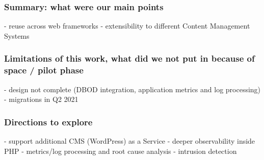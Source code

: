 \subsubsection*{Summary: what were our main points}

- reuse across web frameworks
- extensibility to different Content Management Systems

\subsubsection*{Limitations of this work, what did we not put in because of space / pilot phase}

- design not complete (DBOD integration, application metrics and log processing)
- migrations in Q2 2021

\subsubsection*{Directions to explore}

- support additional CMS (WordPress) as a Service
- deeper observability inside PHP
- metrics/log processing and root cause analysis
- intrusion detection